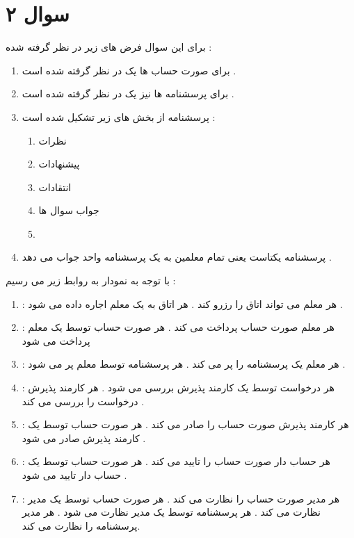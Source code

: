 \documentclass{article}
\begin{document}
\section*{سوال ۲ }
برای این سوال فرض های زیر در نظر گرفته شده  : 
\begin{center}
	\begin{enumerate}
		\item برای صورت حساب ها یک 
		در نظر گرفته شده است  . 
		\item برای پرسشنامه ها نیز یک 
		در نظر گرفته شده است  . 
		
		\item پرسشنامه از بخش های زیر تشکیل شده است  : 
		\begin{enumerate}
			\item نظرات
			\item پیشنهادات
			\item انتقادات 
			\item جواب سوال ها 
			\item 
		\end{enumerate}
	\item پرسشنامه یکتاست یعنی تمام معلمین به یک پرسشنامه واحد جواب می دهد  . 
	\end{enumerate}
\end{center}
با توجه به نمودار 
به روابط زیر می رسیم  : 
\begin{center}
	\begin{enumerate}
		\item \textcolor{red}{}: هر معلم می تواند 
		اتاق را رزرو کند . هر اتاق به یک معلم اجاره داده می شود . 
		\item \textcolor{red}{} : هر معلم 
		صورت حساب پرداخت می کند . هر صورت حساب توسط یک معلم پرداخت می شود 
		\item \textcolor{red}{} : هر معلم یک پرسشنامه را پر می کند . هر پرسشنامه توسط 
		معلم پر می شود  . 
		\item \textcolor{red}{} : هر درخواست توسط یک کارمند پذیرش بررسی می شود  . هر کارمند پذیرش 
		درخواست را بررسی می کند . 
		\item \textcolor{red}{} : هر کارمند پذیرش 
		صورت حساب را صادر می کند . هر صورت حساب توسط یک کارمند پذیرش صادر می شود  . 
		\item \textcolor{red}{} : هر حساب دار 
		صورت حساب را تایید می کند  . هر صورت حساب توسط یک حساب دار تایید می شود  . 
		\item \textcolor{red}{} : هر مدیر 
		صورت حساب را نظارت می کند  . هر صورت حساب توسط یک مدیر نظارت می کند  . هر پرسشنامه توسط یک مدیر نظارت می شود  . هر مدیر 
		پرسشنامه را نظارت می کند. 
	\end{enumerate}
\end{center}
\end{document}
